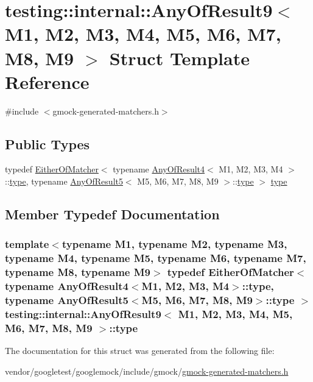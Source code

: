\hypertarget{structtesting_1_1internal_1_1AnyOfResult9}{}\section{testing\+:\+:internal\+:\+:Any\+Of\+Result9$<$ M1, M2, M3, M4, M5, M6, M7, M8, M9 $>$ Struct Template Reference}
\label{structtesting_1_1internal_1_1AnyOfResult9}


{\ttfamily \#include $<$gmock-\/generated-\/matchers.\+h$>$}

\subsection*{Public Types}
\begin{DoxyCompactItemize}
\item 
typedef \hyperlink{classtesting_1_1internal_1_1EitherOfMatcher}{Either\+Of\+Matcher}$<$ typename \hyperlink{structtesting_1_1internal_1_1AnyOfResult4}{Any\+Of\+Result4}$<$ M1, M2, M3, M4 $>$\+::\hyperlink{structtesting_1_1internal_1_1AnyOfResult9_a308935fb02c62f502044dcc7b0a2b464}{type}, typename \hyperlink{structtesting_1_1internal_1_1AnyOfResult5}{Any\+Of\+Result5}$<$ M5, M6, M7, M8, M9 $>$\+::\hyperlink{structtesting_1_1internal_1_1AnyOfResult9_a308935fb02c62f502044dcc7b0a2b464}{type} $>$ \hyperlink{structtesting_1_1internal_1_1AnyOfResult9_a308935fb02c62f502044dcc7b0a2b464}{type}
\end{DoxyCompactItemize}


\subsection{Member Typedef Documentation}
\subsubsection[{\texorpdfstring{type}{type}}]{\setlength{\rightskip}{0pt plus 5cm}template$<$typename M1, typename M2, typename M3, typename M4, typename M5, typename M6, typename M7, typename M8, typename M9$>$ typedef {\bf Either\+Of\+Matcher}$<$ typename {\bf Any\+Of\+Result4}$<$M1, M2, M3, M4$>$\+::{\bf type}, typename {\bf Any\+Of\+Result5}$<$M5, M6, M7, M8, M9$>$\+::{\bf type} $>$ {\bf testing\+::internal\+::\+Any\+Of\+Result9}$<$ M1, M2, M3, M4, M5, M6, M7, M8, M9 $>$\+::{\bf type}}\hypertarget{structtesting_1_1internal_1_1AnyOfResult9_a308935fb02c62f502044dcc7b0a2b464}{}\label{structtesting_1_1internal_1_1AnyOfResult9_a308935fb02c62f502044dcc7b0a2b464}


The documentation for this struct was generated from the following file\+:\begin{DoxyCompactItemize}
\item 
vendor/googletest/googlemock/include/gmock/\hyperlink{gmock-generated-matchers_8h}{gmock-\/generated-\/matchers.\+h}\end{DoxyCompactItemize}
